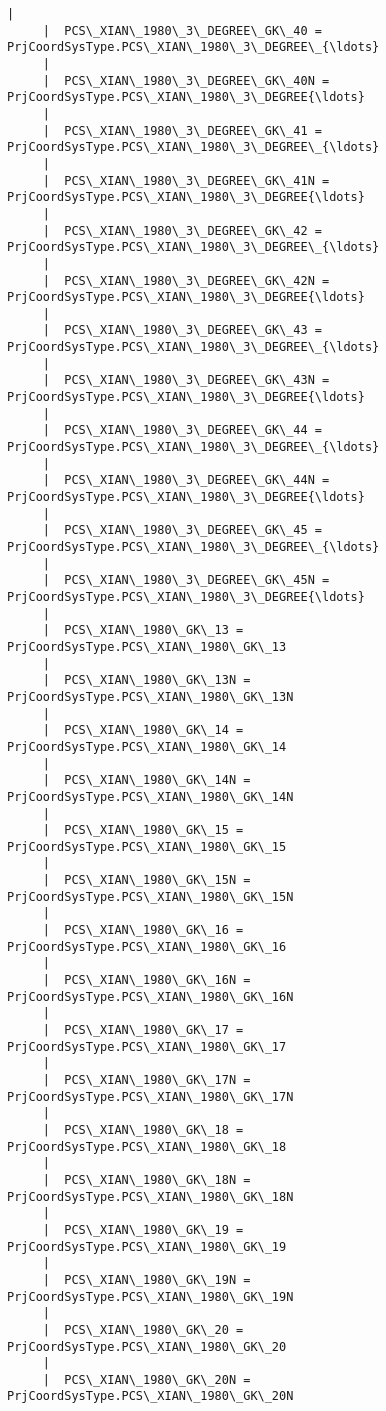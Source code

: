\documentclass[11pt]{article}
\begin{document}
\begin{Verbatim}[commandchars=\\\{\}]
     |  
     |  PCS\_XIAN\_1980\_3\_DEGREE\_GK\_40 = PrjCoordSysType.PCS\_XIAN\_1980\_3\_DEGREE\_{\ldots}
     |  
     |  PCS\_XIAN\_1980\_3\_DEGREE\_GK\_40N = PrjCoordSysType.PCS\_XIAN\_1980\_3\_DEGREE{\ldots}
     |  
     |  PCS\_XIAN\_1980\_3\_DEGREE\_GK\_41 = PrjCoordSysType.PCS\_XIAN\_1980\_3\_DEGREE\_{\ldots}
     |  
     |  PCS\_XIAN\_1980\_3\_DEGREE\_GK\_41N = PrjCoordSysType.PCS\_XIAN\_1980\_3\_DEGREE{\ldots}
     |  
     |  PCS\_XIAN\_1980\_3\_DEGREE\_GK\_42 = PrjCoordSysType.PCS\_XIAN\_1980\_3\_DEGREE\_{\ldots}
     |  
     |  PCS\_XIAN\_1980\_3\_DEGREE\_GK\_42N = PrjCoordSysType.PCS\_XIAN\_1980\_3\_DEGREE{\ldots}
     |  
     |  PCS\_XIAN\_1980\_3\_DEGREE\_GK\_43 = PrjCoordSysType.PCS\_XIAN\_1980\_3\_DEGREE\_{\ldots}
     |  
     |  PCS\_XIAN\_1980\_3\_DEGREE\_GK\_43N = PrjCoordSysType.PCS\_XIAN\_1980\_3\_DEGREE{\ldots}
     |  
     |  PCS\_XIAN\_1980\_3\_DEGREE\_GK\_44 = PrjCoordSysType.PCS\_XIAN\_1980\_3\_DEGREE\_{\ldots}
     |  
     |  PCS\_XIAN\_1980\_3\_DEGREE\_GK\_44N = PrjCoordSysType.PCS\_XIAN\_1980\_3\_DEGREE{\ldots}
     |  
     |  PCS\_XIAN\_1980\_3\_DEGREE\_GK\_45 = PrjCoordSysType.PCS\_XIAN\_1980\_3\_DEGREE\_{\ldots}
     |  
     |  PCS\_XIAN\_1980\_3\_DEGREE\_GK\_45N = PrjCoordSysType.PCS\_XIAN\_1980\_3\_DEGREE{\ldots}
     |  
     |  PCS\_XIAN\_1980\_GK\_13 = PrjCoordSysType.PCS\_XIAN\_1980\_GK\_13
     |  
     |  PCS\_XIAN\_1980\_GK\_13N = PrjCoordSysType.PCS\_XIAN\_1980\_GK\_13N
     |  
     |  PCS\_XIAN\_1980\_GK\_14 = PrjCoordSysType.PCS\_XIAN\_1980\_GK\_14
     |  
     |  PCS\_XIAN\_1980\_GK\_14N = PrjCoordSysType.PCS\_XIAN\_1980\_GK\_14N
     |  
     |  PCS\_XIAN\_1980\_GK\_15 = PrjCoordSysType.PCS\_XIAN\_1980\_GK\_15
     |  
     |  PCS\_XIAN\_1980\_GK\_15N = PrjCoordSysType.PCS\_XIAN\_1980\_GK\_15N
     |  
     |  PCS\_XIAN\_1980\_GK\_16 = PrjCoordSysType.PCS\_XIAN\_1980\_GK\_16
     |  
     |  PCS\_XIAN\_1980\_GK\_16N = PrjCoordSysType.PCS\_XIAN\_1980\_GK\_16N
     |  
     |  PCS\_XIAN\_1980\_GK\_17 = PrjCoordSysType.PCS\_XIAN\_1980\_GK\_17
     |  
     |  PCS\_XIAN\_1980\_GK\_17N = PrjCoordSysType.PCS\_XIAN\_1980\_GK\_17N
     |  
     |  PCS\_XIAN\_1980\_GK\_18 = PrjCoordSysType.PCS\_XIAN\_1980\_GK\_18
     |  
     |  PCS\_XIAN\_1980\_GK\_18N = PrjCoordSysType.PCS\_XIAN\_1980\_GK\_18N
     |  
     |  PCS\_XIAN\_1980\_GK\_19 = PrjCoordSysType.PCS\_XIAN\_1980\_GK\_19
     |  
     |  PCS\_XIAN\_1980\_GK\_19N = PrjCoordSysType.PCS\_XIAN\_1980\_GK\_19N
     |  
     |  PCS\_XIAN\_1980\_GK\_20 = PrjCoordSysType.PCS\_XIAN\_1980\_GK\_20
     |  
     |  PCS\_XIAN\_1980\_GK\_20N = PrjCoordSysType.PCS\_XIAN\_1980\_GK\_20N

\end{Verbatim}
\end{document}
